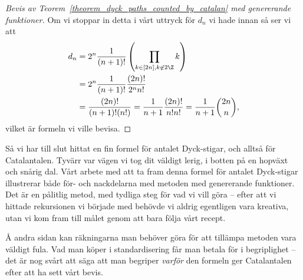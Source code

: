 \documentclass[nobib]{tufte-handout}
\begin{document}
\begin{proof}[Bevis av Teorem~\ref{theorem_dyck_paths_counted_by_catalan} med genererande funktioner]
    Om vi stoppar in detta i vårt uttryck för $d_n$ vi hade innan så ser vi att
    \begin{align*}
        d_n &= 2^n \frac{1}{(n+1)!}\left(\prod_{k \in [2n], k \not\in2\Z} k\right)\\
        &= 2^n \frac{1}{(n+1)!}\frac{(2n)!}{2^n n!}\\
        &= \frac{(2n)!}{(n+1)!(n!)} = \frac{1}{n+1} \frac{(2n)!}{n!n!} = \frac{1}{n+1}\binom{2n}{n},
    \end{align*}
    vilket är formeln vi ville bevisa.
\end{proof}

Så vi har till slut hittat en fin formel för antalet Dyck-stigar, och alltså för Catalantalen. Tyvärr var vägen vi tog dit väldigt lerig, i botten på en hopväxt och snårig dal. Vårt arbete med att ta fram denna formel för antalet Dyck-stigar illustrerar både för- och nackdelarna med metoden med genererande funktioner. Det är en pålitlig metod, med tydliga steg för vad vi vill göra -- efter att vi hittade rekursionen vi började med behövde vi aldrig egentligen vara kreativa, utan vi kom fram till målet genom att bara följa vårt recept.

Å andra sidan kan räkningarna man behöver göra för att tillämpa metoden vara väldigt fula. Vad man köper i standardisering får man betala för i begriplighet -- det är nog svårt att säga att man begriper \emph{varför} den formeln ger Catalantalen efter att ha sett vårt bevis.

%
%
\end{document}
